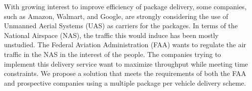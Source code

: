

With growing interest to improve efficiency of package delivery, some companies, such as Amazon, Walmart, and Google, are strongly considering the use of Unmanned Aerial Systems (UAS) as carriers for the packages. In terms of the National Airspace (NAS), the traffic this would induce has been mostly unstudied. The Federal Aviation Administration (FAA) wants to regulate the air traffic in the NAS in the interest of the people. The companies trying to implement this delivery service want to maximize throughput while meeting time constraints. We propose a solution that meets the requirements of both the FAA and prospective companies using a multiple package per vehicle delivery scheme.
